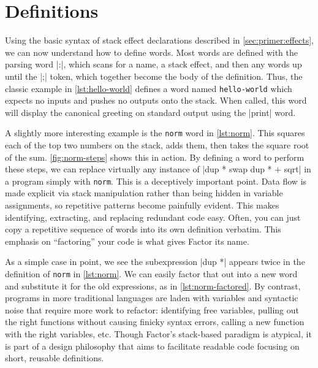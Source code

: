 \section{Definitions}\label{sec:primer:colon-defs}



Using the basic syntax of stack effect declarations described in
\cref{sec:primer:effects}, we can now understand how to define words.  Most
words are defined with the parsing word \factor|:|, which scans for a name, a
stack effect, and then any words up until the \factor|;| token, which together
become the body of the definition.  Thus, the classic example in
\vref{lst:hello-world} defines a word named \Verb|hello-world| which expects
no inputs and pushes no outputs onto the stack.  When called, this word will
display the canonical greeting on standard output using the \factor|print|
word.


A slightly more interesting example is the \Verb|norm| word in
\vref{lst:norm}.  This squares each of the top two numbers on the stack, adds
them, then takes the square root of the sum.  \vref{fig:norm-steps} shows this
in action.  By defining a word to perform these steps, we can replace virtually
any instance of
%
\factor|dup * swap dup * + sqrt|
%
in a program simply with \Verb|norm|.  This is a deceptively important point.
Data flow is made explicit via stack manipulation rather than being hidden in
variable assignments, so repetitive patterns become painfully evident.  This
makes identifying, extracting, and replacing redundant code easy.  Often, you
can just copy a repetitive sequence of words into its own definition verbatim.
This emphasis on ``factoring'' your code is what gives Factor its name.


As a simple case in point, we see the subexpression \factor|dup *| appears
twice in the definition of \Verb|norm| in \vref{lst:norm}.  We can easily
factor that out into a new word and substitute it for the old expressions, as
in \vref{lst:norm-factored}.  By contrast, programs in more traditional
languages are laden with variables and syntactic noise that require more work
to refactor: identifying free variables, pulling out the right functions
without causing finicky syntax errors, calling a new function with the right
variables, etc.  Though Factor's stack-based paradigm is atypical, it is part
of a design philosophy that aims to facilitate readable code focusing on short,
reusable definitions.
